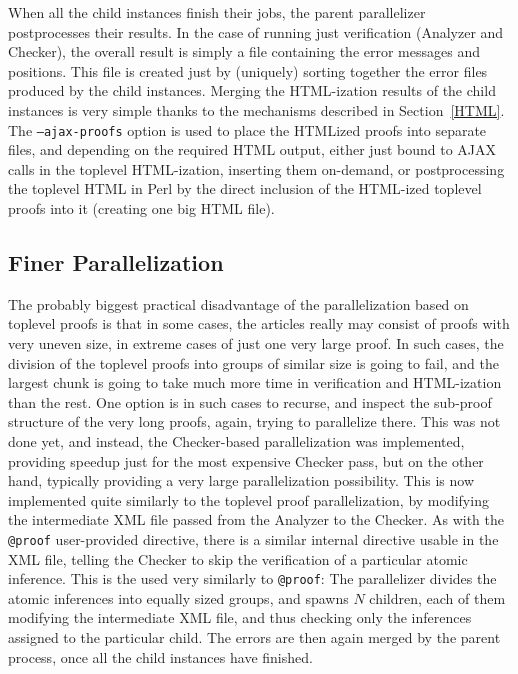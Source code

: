 \documentclass{llncs}
\begin{document}
\vspace{-1cm}
When all the child instances finish their jobs, the parent
parallelizer postprocesses their results. In the case of running just
verification (Analyzer and Checker), the overall result is simply a
file containing the error messages and positions. This file is created
just by (uniquely) sorting together the error files produced by the
child instances.  Merging the HTML-ization results of the child
instances is very simple thanks to the mechanisms described in
Section~\ref{HTML}.  The {\tt --ajax-proofs} option is used to place
the HTMLized proofs into separate files, and depending on the required
HTML output, either just bound to AJAX calls in the toplevel
HTML-ization, inserting them on-demand, or postprocessing the toplevel
HTML in Perl by the direct inclusion of the HTML-ized toplevel proofs
into it (creating one big HTML file).

\subsection{Finer Parallelization}
The probably biggest practical disadvantage of the parallelization
based on toplevel proofs is that in some cases, the articles really
may consist of proofs with very uneven size, in extreme cases of just
one very large proof.  In such cases, the division of the toplevel
proofs into groups of similar size is going to fail, and the largest
chunk is going to take much more time in verification and HTML-ization
than the rest. One option is in such cases to recurse, and inspect the
sub-proof structure of the very long proofs, again, trying to
parallelize there.  This was not done yet, and instead, the
Checker-based parallelization was implemented, providing speedup just
for the most expensive Checker pass, but on the other hand, typically
providing a very large parallelization possibility.  This is now
implemented quite similarly to the toplevel proof parallelization, by
modifying the intermediate XML file passed from the Analyzer to the
Checker. As with the {\tt @proof} user-provided directive, there is a
similar internal directive usable in the XML file, telling the Checker
to skip the verification of a particular atomic inference. This is the
used very similarly to {\tt @proof}: The parallelizer divides the
atomic inferences into equally sized groups, and spawns $N$ children,
each of them modifying the intermediate XML file, and thus checking
only the inferences assigned to the particular child. The errors are
then again merged by the parent process, once all the child instances
have finished. 
\end{document}
